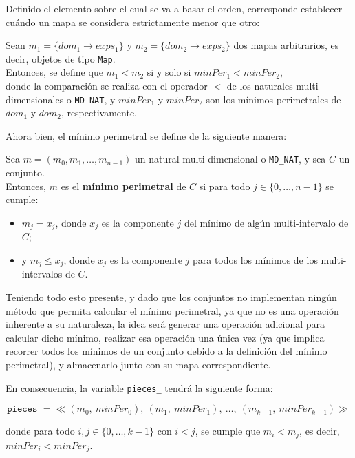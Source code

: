 Definido el elemento sobre el cual se va a basar el orden, corresponde establecer cuándo un mapa se considera estrictamente menor que otro:

\begin{center}
Sean $m_1 = \{ dom_1 \rightarrow exps_1 \}$ y $m_2 = \{ dom_2 \rightarrow exps_2 \}$ dos mapas arbitrarios, es decir, objetos de tipo \texttt{Map}. \\
Entonces, se define que $m_1 < m_2$ si y solo si $minPer_1 < minPer_2$, \\
donde la comparación se realiza con el operador $<$ de los naturales multi-dimensionales o \texttt{MD\_NAT}, y $minPer_1$ y $minPer_2$ son los mínimos perimetrales de $dom_1$ y $dom_2$, respectivamente.
\end{center}

Ahora bien, el mínimo perimetral se define de la siguiente manera:

\begin{center}
Sea $m = (m_0, m_1, \dots, m_{n-1})$ un natural multi-dimensional o \texttt{MD\_NAT}, y sea $C$ un conjunto. \\
Entonces, $m$ es el \textbf{mínimo perimetral} de $C$ si para todo $j \in \{0, \dots, n-1\}$ se cumple:

\begin{itemize}
    \item $m_j = x_j$, donde $x_j$ es la componente $j$ del mínimo de algún multi-intervalo de $C$;
    \item y $m_j \leq x_j$, donde $x_j$ es la componente $j$ para todos los mínimos de los multi-intervalos de $C$.
\end{itemize}
\end{center}

Teniendo todo esto presente, y dado que los conjuntos no implementan ningún método que permita calcular el mínimo perimetral, ya que no es una operación inherente a su naturaleza, la idea será generar una operación adicional para calcular dicho mínimo, realizar esa operación una única vez (ya que implica recorrer todos los mínimos de un conjunto debido a la definición del mínimo perimetral), y almacenarlo junto con su mapa correspondiente. 

En consecuencia, la variable \texttt{pieces\_} tendrá la siguiente forma:

\[
\texttt{pieces\_} = \ll (m_0,\ minPer_0),\ (m_1,\ minPer_1),\ \dots,\ (m_{k-1},\ minPer_{k-1}) \gg
\]

donde para todo $i, j \in \{0,\dots,k-1\}$ con $i < j$, se cumple que $m_i < m_j$, es decir, $minPer_i < minPer_j$.

